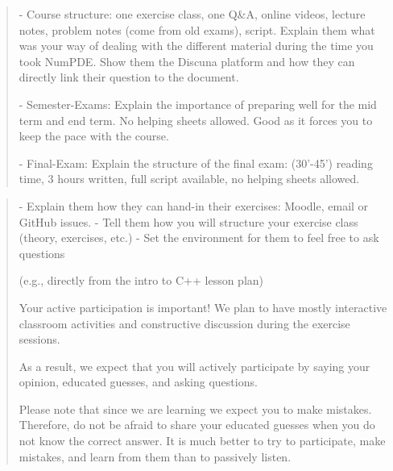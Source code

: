 

\begin{quote}
    - Course structure: one exercise class, one Q\&A, online videos, lecture notes, problem notes (come from old exams), script. Explain them what was your way of dealing with the different material during the time you took NumPDE. Show them the Discuna platform and how they can directly link their question to the document.
    
    - Semester-Exams: Explain the importance of preparing well for the mid term and end term. No helping sheets allowed. Good as it forces you to keep the pace with the course.
    
    - Final-Exam: Explain the structure of the final exam: (30'-45') reading time, 3 hours written, full script available, no helping sheets allowed.
\end{quote}

\quest


\begin{quote}
    - Explain them how they can hand-in their exercises: Moodle, email or GitHub issues.
    - Tell them how you will structure your exercise class (theory, exercises, etc.)
    - Set the environment for them to feel free to ask questions
    
    (e.g., directly from the intro to C++ lesson plan)

    Your active participation is important! We plan to have mostly
    interactive classroom activities and constructive discussion during
    the exercise sessions.

    As a result, we expect that you will actively participate by saying
    your opinion, educated guesses, and asking questions.

    Please note that since we are learning we expect you to make
    mistakes. Therefore, do not be afraid to share your educated guesses
    when you do not know the correct answer. It is much better to try to
    participate, make mistakes, and learn from them than to passively
    listen.
\end{quote}

\quest




